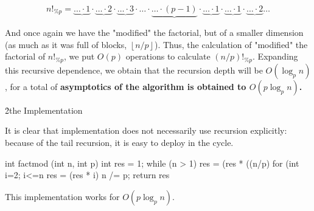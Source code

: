 $$ n!_{\%p} = \underbrace{ \ldots \cdot 1 } \cdot \underbrace{ \ldots \cdot 2 } \cdot \underbrace{ \ldots \cdot 3 } \cdot \ldots \cdot \underbrace{ \ldots \cdot (p-1) } \cdot \underbrace{ \ldots \cdot 1 } \cdot \underbrace{ \ldots \cdot 1 } \cdot \underbrace{ \ldots \cdot 2 } \ldots $$

And once again we have the "modified" the factorial, but of a smaller dimension (as much as it was full of blocks, $\left\lfloor n / p \right\rfloor$). Thus, the calculation of "modified" the factorial of $n!_{\%p}$, we put $O(p)$ operations to calculate $(n/p)!_{\%p}$. Expanding this recursive dependence, we obtain that the recursion depth will be $O (\log_p n)$, for a total of \bf{asymptotics} of the algorithm is obtained to $O(p \log_p n)$.

\h2{the Implementation}

It is clear that implementation does not necessarily use recursion explicitly: because of the tail recursion, it is easy to deploy in the cycle.

\code
int factmod (int n, int p) {
int res = 1;
while (n > 1) {
res = (res * ((n/p) %
for (int i=2; i<=n%
res = (res * i) %
n /= p;
}
return res %
}
\endcode

This implementation works for $O(p \log_p n)$.